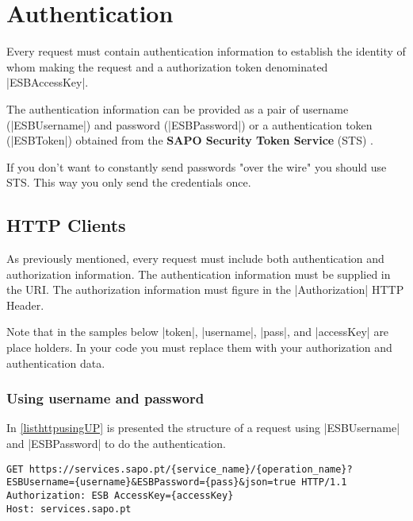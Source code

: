 \chapter{Authentication}
\label{sec:chapter3}

Every request must contain authentication information to establish the identity of whom making the request and a authorization token denominated \icode|ESBAccessKey|.

The authentication information can be provided as a pair of username (\icode|ESBUsername|) and password (\icode|ESBPassword|) or a authentication token (\icode|ESBToken|) obtained from the \textbf{SAPO Security Token Service} (STS) \cite{sts}.

If you don't want to constantly send passwords "over the wire" you should use STS. This way you only send the credentials once.

\section{HTTP Clients}
\label{sec:chapter3:http}

As previously mentioned, every request must include both authentication and authorization information. The authentication information must be supplied in the URI. The authorization information must figure in the \icode|Authorization| HTTP Header.

Note that in the samples below \icode|{token}|, \icode|{username}|, \icode|{pass}|, and \icode|{accessKey}| are place holders. In your code you must replace them with your authorization and authentication data.

\subsection{Using username and password}
\label{sec:chapter3:http:withuserpass}

In \autoref{listhttpusingUP} is presented the structure of a request using \icode|ESBUsername| and \icode|ESBPassword| to do the authentication.

\begin{lstlisting}[label=listhttpusingUP,caption=HTTP GET using \icode|ESBUsername| and \icode|ESBPassword|]
GET https://services.sapo.pt/{service_name}/{operation_name}?ESBUsername={username}&ESBPassword={pass}&json=true HTTP/1.1
Authorization: ESB AccessKey={accessKey}
Host: services.sapo.pt
\end{lstlisting}

